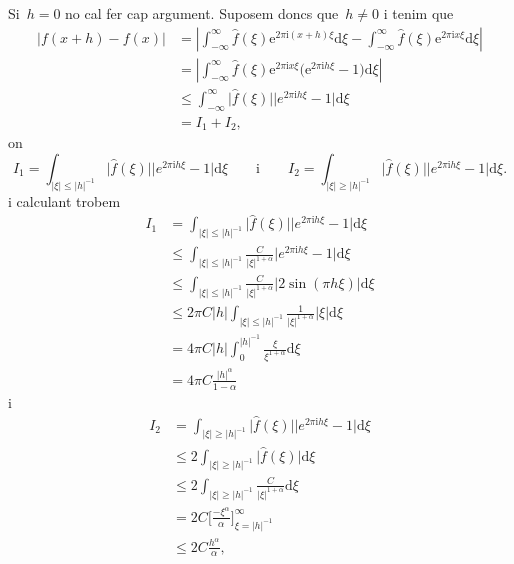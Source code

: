 \documentclass[a4paper]{article}
\theoremstyle{definition}
\newcommand{\iu}{\mathrm{i}}
\newcommand{\e}{\mathrm{e}}
\providecommand{\uppi}{\pi}
\newcommand{\diff}{\mathrm{d}}
\newcommand{\abs}[1]{\lvert{#1}\rvert}
\newcommand{\Abs}[1]{\left\lvert{#1}\right\rvert}
\begin{document}
Si~\(h=0\) no cal fer cap argument.
Suposem doncs que~\(h\neq0\) i tenim que
\begin{align*}
    \abs{f(x+h) - f(x)} &= \Abs{\int_{-\infty}^{\infty}
                           \widehat{f}(\xi)\e^{2\uppi\iu(x+h)\xi}\diff\xi
                         - \int_{-\infty}^{\infty}
                           \widehat{f}(\xi)\e^{2\uppi\iu x\xi}\diff\xi} \\
                        &= \Abs{\int_{-\infty}^{\infty}
                           \widehat{f}(\xi)\e^{2\uppi\iu x\xi}
                           \bigl(\e^{2\uppi\iu h\xi}-1\bigr)
                           \diff\xi} \\
                        &\leq \int_{-\infty}^{\infty}
                           \abs{\widehat{f}(\xi)}\abs{e^{2\uppi\iu h\xi}-1}
                           \diff\xi \\
                        &= I_{1} + I_{2},
\end{align*}
on
\[
    I_{1} = \int_{\abs{\xi}\leq\abs{h}^{-1}}
    \abs{\widehat{f}(\xi)}\abs{e^{2\uppi\iu h\xi}-1} \diff\xi
    \qquad\text{i}\qquad
    I_{2} = \int_{\abs{\xi}\geq\abs{h}^{-1}}
    \abs{\widehat{f}(\xi)}\abs{e^{2\uppi\iu h\xi}-1} \diff\xi.
\]
i calculant trobem
\begin{align*}
    I_{1} &= \int_{\abs{\xi}\leq\abs{h}^{-1}}
             \abs{\widehat{f}(\xi)}\abs{e^{2\uppi\iu h\xi}-1}
             \diff\xi \\
          &\leq \int_{\abs{\xi}\leq\abs{h}^{-1}}
             \frac{C}{\abs{\xi}^{1+\alpha}}
             \abs{e^{2\uppi\iu h\xi}-1}
             \diff\xi \\
          &\leq \int_{\abs{\xi}\leq\abs{h}^{-1}}
             \frac{C}{\abs{\xi}^{1+\alpha}}
             \abs{2\sin(\uppi h\xi)}
             \diff\xi \\
          &\leq 2\uppi C\abs{h}
             \int_{\abs{\xi}\leq\abs{h}^{-1}}
             \frac{1}{\abs{\xi}^{1+\alpha}}\abs{\xi}
             \diff\xi \\
          &= 4\uppi C\abs{h}
             \int_{0}^{\abs{h}^{-1}}
             \frac{\xi}{\xi^{1+\alpha}}
             \diff\xi \\
          &= 4\uppi C\frac{\abs{h}^{\alpha}}{1-\alpha}
\end{align*}
i
\begin{align*}
    I_{2} &= \int_{\abs{\xi}\geq\abs{h}^{-1}}
             \abs{\widehat{f}(\xi)}\abs{e^{2\uppi\iu h\xi}-1}
             \diff\xi \\
          &\leq 2\int_{\abs{\xi}\geq\abs{h}^{-1}}
                \abs{\widehat{f}(\xi)}\diff\xi \\
          &\leq 2\int_{\abs{\xi}\geq\abs{h}^{-1}}
                \frac{C}{\abs{\xi}^{1+\alpha}} \diff\xi \\
          &= 2C
          \biggl[\frac{-\xi^{\alpha}}{\alpha}\biggr]_{\xi=\abs{h}^{-1}}^{\infty} \\
          &\leq 2C\frac{h^{\alpha}}{\alpha},
\end{align*}
\end{document}
